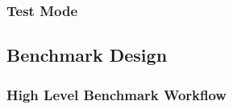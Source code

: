 
\subsubsection{Test Mode}

\subsection{Benchmark Design}
\subsubsection{High Level Benchmark Workflow}

